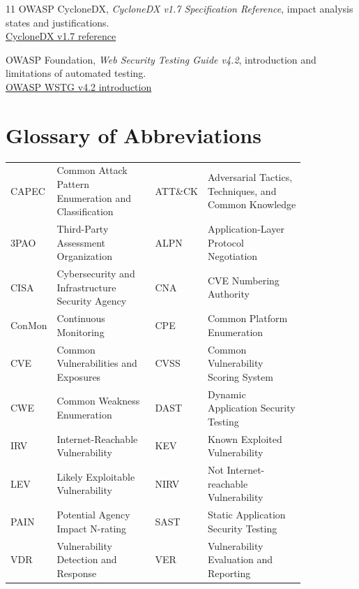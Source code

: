 \documentclass[11pt]{article}
\begin{document}
\begin{thebibliography}{11}
OWASP CycloneDX, \emph{CycloneDX v1.7 Specification Reference}, impact
analysis states and justifications.\\
\href{https://cyclonedx.org/docs/1.7/}{CycloneDX v1.7 reference}

OWASP Foundation, \emph{Web Security Testing Guide v4.2}, introduction and
limitations of automated testing.\\
\href{https://owasp.org/www-project-web-security-testing-guide/v42/2-Introduction/README}{OWASP WSTG v4.2 introduction}
\end{thebibliography}

\section*{Glossary of Abbreviations}
\begin{center}
\footnotesize
\begin{tabular}{>{\ttfamily}p{0.08\linewidth}p{0.34\linewidth}>{\ttfamily}p{0.08\linewidth}p{0.34\linewidth}}
CAPEC & Common Attack Pattern Enumeration and Classification & ATT\&CK & Adversarial Tactics, Techniques, and Common Knowledge \\
3PAO & Third-Party Assessment Organization & ALPN & Application-Layer Protocol Negotiation \\
CISA & Cybersecurity and Infrastructure Security Agency & CNA & CVE Numbering Authority \\
ConMon & Continuous Monitoring & CPE & Common Platform Enumeration \\
CVE & Common Vulnerabilities and Exposures & CVSS & Common Vulnerability Scoring System \\
CWE & Common Weakness Enumeration & DAST & Dynamic Application Security Testing \\
IRV & Internet-Reachable Vulnerability & KEV & Known Exploited Vulnerability \\
LEV & Likely Exploitable Vulnerability & NIRV & Not Internet-reachable Vulnerability \\
PAIN & Potential Agency Impact N-rating & SAST & Static Application Security Testing \\
VDR & Vulnerability Detection and Response & VER & Vulnerability Evaluation and Reporting \\
\end{tabular}
\end{center}
\end{document}

